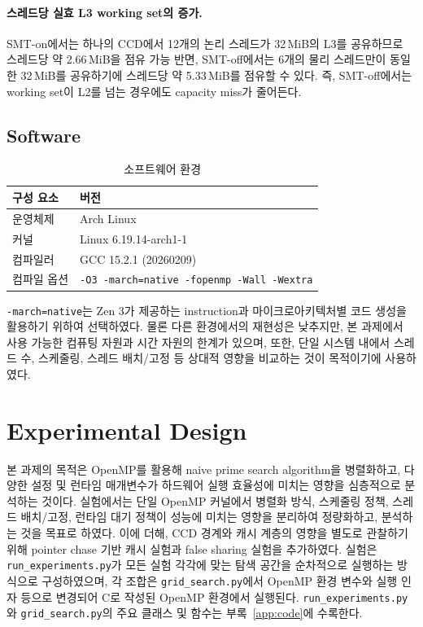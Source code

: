 \documentclass[11pt,a4paper]{article}
\begin{document}
\paragraph{스레드당 실효 L3 working set의 증가.}
SMT-on에서는 하나의 CCD에서 12개의 논리 스레드가 32\,MiB의 L3를 공유하므로 스레드당 약 2.66\,MiB을 점유 가능 반면, SMT-off에서는 6개의 물리 스레드만이 동일한 32\,MiB를 공유하기에 스레드당 약 5.33\,MiB를 점유할 수 있다. 즉, SMT-off에서는 working set이 L2를 넘는 경우에도 capacity miss가 줄어든다.

\subsection{Software}

\begin{table}[h]
\centering
\begin{tabular}{ll}
\toprule
구성 요소 & 버전 \\
\midrule
운영체제 & Arch Linux \\
커널 & Linux 6.19.14-arch1-1 \\
컴파일러 & GCC 15.2.1 (20260209) \\
컴파일 옵션 & \texttt{-O3 -march=native -fopenmp -Wall -Wextra} \\
\bottomrule
\end{tabular}
\caption{소프트웨어 환경}
\end{table}

\texttt{-march=native}는 Zen 3가 제공하는 instruction과 마이크로아키텍처별 코드 생성을 활용하기 위하여 선택하였다. 물론 다른 환경에서의 재현성은 낮추지만, 본 과제에서 사용 가능한 컴퓨팅 자원과 시간 자원의 한계가 있으며, 또한, 단일 시스템 내에서 스레드 수, 스케줄링, 스레드 배치/고정 등 상대적 영향을 비교하는 것이 목적이기에 사용하였다.

\section{Experimental Design}

본 과제의 목적은 OpenMP를 활용해 naive prime search algorithm을 병렬화하고, 다양한 설정 및 런타임 매개변수가 하드웨어 실행 효율성에 미치는 영향을 심층적으로 분석하는 것이다. 실험에서는 단일 OpenMP 커널에서 병렬화 방식, 스케줄링 정책, 스레드 배치/고정, 런타임 대기 정책이 성능에 미치는 영향을 분리하여 정량화하고, 분석하는 것을 목표로 하였다. 이에 더해, CCD 경계와 캐시 계층의 영향을 별도로 관찰하기 위해 pointer chase 기반 캐시 실험과 false sharing 실험을 추가하였다. 실험은 \texttt{run\_experiments.py}가 모든 실험 각각에 맞는 탐색 공간을 순차적으로 실행하는 방식으로 구성하였으며, 각 조합은 \texttt{grid\_search.py}에서 OpenMP 환경 변수와 실행 인자 등으로 변경되어 C로 작성된 OpenMP 환경에서 실행된다. \texttt{run\_experiments.py}와 \texttt{grid\_search.py}의 주요 클래스 및 함수는 부록~\ref{app:code}에 수록한다.
\end{document}
